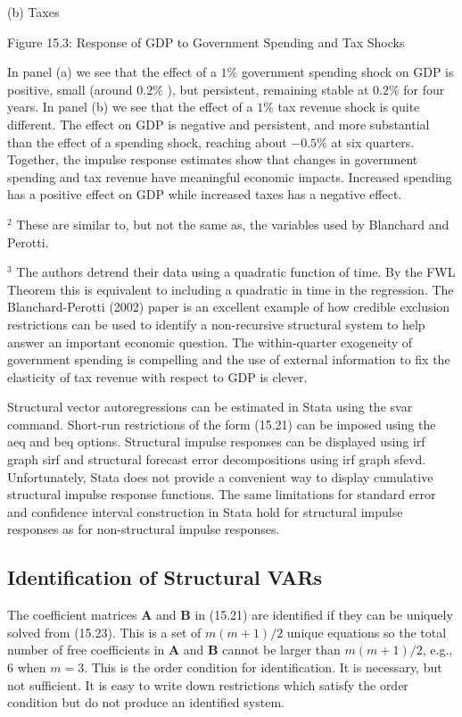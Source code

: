 \documentclass[10pt]{article}
\begin{document}
(b) Taxes

Figure 15.3: Response of GDP to Government Spending and Tax Shocks

In panel (a) we see that the effect of a $1 \%$ government spending shock on GDP is positive, small (around $0.2 \%$ ), but persistent, remaining stable at $0.2 \%$ for four years. In panel (b) we see that the effect of a $1 \%$ tax revenue shock is quite different. The effect on GDP is negative and persistent, and more substantial than the effect of a spending shock, reaching about $-0.5 \%$ at six quarters. Together, the impulse response estimates show that changes in government spending and tax revenue have meaningful economic impacts. Increased spending has a positive effect on GDP while increased taxes has a negative effect.

${ }^{2}$ These are similar to, but not the same as, the variables used by Blanchard and Perotti.

${ }^{3}$ The authors detrend their data using a quadratic function of time. By the FWL Theorem this is equivalent to including a quadratic in time in the regression. The Blanchard-Perotti (2002) paper is an excellent example of how credible exclusion restrictions can be used to identify a non-recursive structural system to help answer an important economic question. The within-quarter exogeneity of government spending is compelling and the use of external information to fix the elasticity of tax revenue with respect to GDP is clever.

Structural vector autoregressions can be estimated in Stata using the svar command. Short-run restrictions of the form (15.21) can be imposed using the aeq and beq options. Structural impulse responses can be displayed using irf graph sirf and structural forecast error decompositions using irf graph sfevd. Unfortunately, Stata does not provide a convenient way to display cumulative structural impulse response functions. The same limitations for standard error and confidence interval construction in Stata hold for structural impulse responses as for non-structural impulse responses.

\subsection{Identification of Structural VARs}
The coefficient matrices $\boldsymbol{A}$ and $\boldsymbol{B}$ in (15.21) are identified if they can be uniquely solved from (15.23). This is a set of $m(m+1) / 2$ unique equations so the total number of free coefficients in $\boldsymbol{A}$ and $\boldsymbol{B}$ cannot be larger than $m(m+1) / 2$, e.g., 6 when $m=3$. This is the order condition for identification. It is necessary, but not sufficient. It is easy to write down restrictions which satisfy the order condition but do not produce an identified system.
\end{document}
